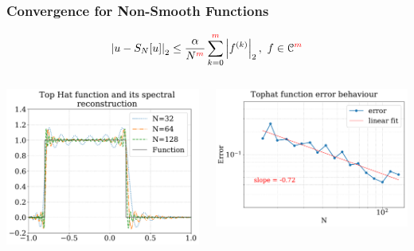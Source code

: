 \documentclass[]{beamer}
\newcommand{\norm}[1]{\left| #1 \right|_2}
\begin{document}
\begin{frame}
  \frametitle{Convergence for Non-Smooth Functions}
  \begin{displaymath}
    \norm{u - S_N[u]} \leq \frac{\alpha}{N^{\color{red}m}}\sum_{k=0}^{{\color{red}m}}
    \norm{f^{(k)}},\ f\in \mathcal{C}^{\color{red}m}
  \end{displaymath}
  \begin{columns}
    \begin{column}{0.5\textwidth}
      \begin{center}
        \includegraphics[width=\textwidth]{gibbs}
      \end{center}
    \end{column}
    \begin{column}{0.5\textwidth}
      \begin{center}
        \includegraphics[width=\textwidth]{tophat_error}
      \end{center}
    \end{column}
  \end{columns}
\end{frame}
\end{document}
